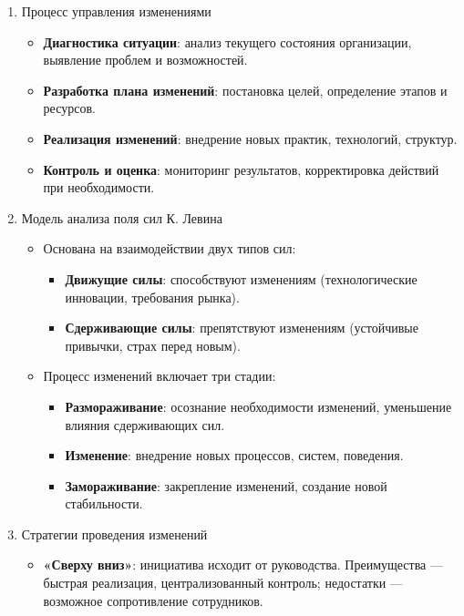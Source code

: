 \begin{enumerate}
    \item Процесс управления изменениями
        \begin{itemize}
            \item \textbf{Диагностика ситуации}: анализ текущего состояния организации, выявление проблем и возможностей.
            \item \textbf{Разработка плана изменений}: постановка целей, определение этапов и ресурсов.
            \item \textbf{Реализация изменений}: внедрение новых практик, технологий, структур.
            \item \textbf{Контроль и оценка}: мониторинг результатов, корректировка действий при необходимости.
        \end{itemize}
    \item Модель анализа поля сил К. Левина
        \begin{itemize}
            \item Основана на взаимодействии двух типов сил:
            \begin{itemize}
                \item \textbf{Движущие силы}: способствуют изменениям (технологические инновации, требования рынка).
                \item \textbf{Сдерживающие силы}: препятствуют изменениям (устойчивые привычки, страх перед новым).
            \end{itemize}
            \item Процесс изменений включает три стадии:
            \begin{itemize}
                \item \textbf{Размораживание}: осознание необходимости изменений, уменьшение влияния сдерживающих сил.
                \item \textbf{Изменение}: внедрение новых процессов, систем, поведения.
                \item \textbf{Замораживание}: закрепление изменений, создание новой стабильности.
            \end{itemize}
        \end{itemize}
    \item Стратегии проведения изменений
        \begin{itemize}
            \item \textbf{«Сверху вниз»}: инициатива исходит от руководства. Преимущества --- быстрая реализация, централизованный контроль; недостатки --- возможное сопротивление сотрудников.

\end{itemize}
\end{enumerate}
